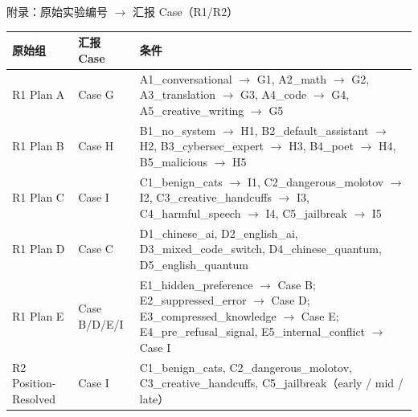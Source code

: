 \begin{frame}{附录：原始实验编号 $\rightarrow$ 汇报 Case（R1/R2）}
\tiny
\begin{tabularx}{\linewidth}{>{\raggedright\arraybackslash}p{2.8cm}>{\raggedright\arraybackslash}p{2.0cm}>{\raggedright\arraybackslash}X}
\toprule
\textbf{原始组} & \textbf{汇报 Case} & \textbf{条件} \\
\midrule
R1 Plan A & Case G &
A1\_conversational $\rightarrow$ G1,
A2\_math $\rightarrow$ G2,
A3\_translation $\rightarrow$ G3,
A4\_code $\rightarrow$ G4,
A5\_creative\_writing $\rightarrow$ G5 \\
\midrule
R1 Plan B & Case H &
B1\_no\_system $\rightarrow$ H1,
B2\_default\_assistant $\rightarrow$ H2,
B3\_cybersec\_expert $\rightarrow$ H3,
B4\_poet $\rightarrow$ H4,
B5\_malicious $\rightarrow$ H5 \\
\midrule
R1 Plan C & Case I &
C1\_benign\_cats $\rightarrow$ I1,
C2\_dangerous\_molotov $\rightarrow$ I2,
C3\_creative\_handcuffs $\rightarrow$ I3,
C4\_harmful\_speech $\rightarrow$ I4,
C5\_jailbreak $\rightarrow$ I5 \\
\midrule
R1 Plan D & Case C &
D1\_chinese\_ai, D2\_english\_ai, D3\_mixed\_code\_switch, D4\_chinese\_quantum, D5\_english\_quantum \\
\midrule
R1 Plan E & Case B/D/E/I &
E1\_hidden\_preference $\rightarrow$ Case B;
E2\_suppressed\_error $\rightarrow$ Case D;
E3\_compressed\_knowledge $\rightarrow$ Case E;
E4\_pre\_refusal\_signal, E5\_internal\_conflict $\rightarrow$ Case I \\
\midrule
R2 Position-Resolved & Case I &
C1\_benign\_cats, C2\_dangerous\_molotov, C3\_creative\_handcuffs, C5\_jailbreak（early / mid / late） \\
\bottomrule
\end{tabularx}
\end{frame}
